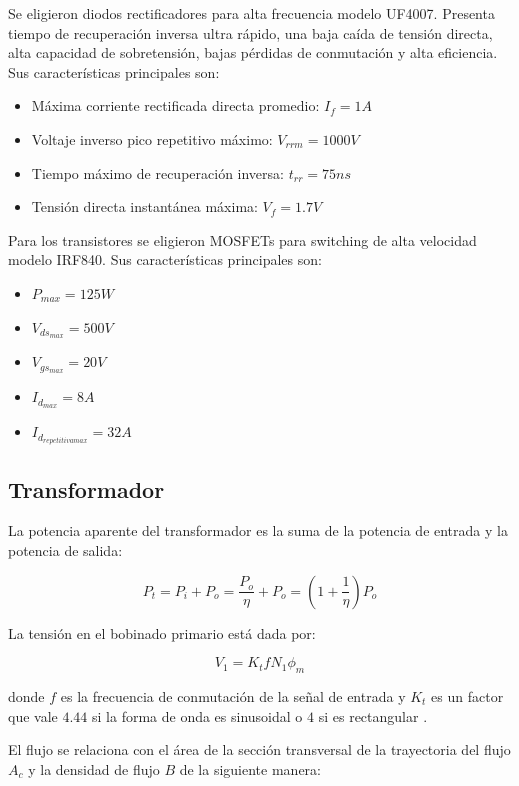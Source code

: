 Se eligieron diodos rectificadores para alta frecuencia modelo UF4007. 
Presenta tiempo de recuperación inversa ultra rápido, una baja caída de tensión directa, alta capacidad de sobretensión, bajas pérdidas de conmutación y alta eficiencia.
Sus características principales son: 

\begin{itemize}
    \item Máxima corriente rectificada directa promedio: $I_f=1A$
    \item Voltaje inverso pico repetitivo máximo: $V_{rrm}=1000V$
    \item Tiempo máximo de recuperación inversa: $t_{rr}=75ns$
    \item Tensión directa instantánea máxima: $V_f=1.7V$
\end{itemize}

Para los transistores se eligieron MOSFETs para switching de alta velocidad modelo IRF840. 
Sus características principales son: 

\begin{itemize}
    \item $P_{max}=125W$
    \item $V_{ds_{max}}=500V$
    \item $V_{gs_{max}}=20V$
    \item $I_{d_{max}}=8A$
    \item $I_{d_{repetitiva max}}=32A$
\end{itemize}

\subsection{Transformador}

La potencia aparente del transformador es la suma de la potencia de entrada y la potencia de salida:

$$ P_{t}=P_{i}+P_{o}=\frac{P_{o}}{\eta}+P_{o}=\left(1+\frac{1}{\eta}\right)P_{o} $$

La tensión en el bobinado primario está dada por: 

$$ V_{1}=K_{t} f N_{1} \phi_{m} $$

donde $f$ es la frecuencia de conmutación de la señal de entrada y 
$K_t$ es un factor que vale $4.44$ si la forma de onda es sinusoidal o $4$ si es rectangular \cite{rashid}.

El flujo se relaciona con el área de la sección transversal de la trayectoria del flujo $A_{c}$ y la densidad de flujo $B$ de la siguiente manera:

